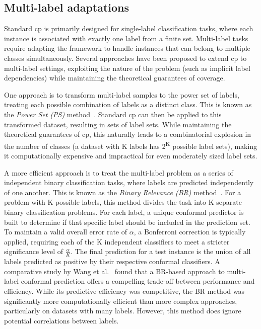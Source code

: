 \subsection{Multi-label adaptations}

Standard \gls{cp} is primarily designed for single-label classification tasks,
where each instance is associated with exactly one label from a finite set.
Multi-label tasks require adapting the framework to handle instances
that can belong to multiple classes simultaneously.
Several approaches have been proposed to extend \gls{cp} to multi-label settings,
exploiting the nature of the problem (such as implicit label dependencies)
while maintaining the theoretical guarantees of coverage.

One approach is to transform multi-label samples to the power set of labels,
treating each possible combination of labels as a distinct class.
This is known as the \emph{Power Set (PS)} method~\cite{papadopoulos2014cross}.
Standard \gls{cp} can then be applied to this transformed dataset,
resulting in sets of label sets.
While maintaining the theoretical guarantees of \gls{cp},
this naturally leads to a combinatorial explosion in the number of classes
(a dataset with K labels has 2\textsuperscript{K} possible label sets),
making it computationally expensive and impractical
for even moderately sized label sets.

A more efficient approach is to treat the multi-label problem as
a series of independent binary classification tasks,
where labels are predicted independently of one another.
This is known as the \emph{Binary Relevance (BR)} method~\cite{wang2015comparison}.
For a problem with K possible labels, this method divides the task
into K separate binary classification problems.
For each label, a unique conformal predictor is built
to determine if that specific label should be included in the prediction set.
To maintain a valid overall error rate of \(\alpha\),
a Bonferroni correction is typically applied,
requiring each of the K independent classifiers to meet
a stricter significance level of \(\frac{\alpha}{K}\).
The final prediction for a test instance is the union of all labels
predicted as positive by their respective conformal classifiers.
A comparative study by Wang et al.~\cite{wang2015comparison}
found that a BR-based approach
to multi-label conformal prediction offers a compelling trade-off
between performance and efficiency.
While its predictive efficiency was competitive,
the BR method was significantly more computationally efficient than more complex approaches,
particularly on datasets with many labels.
However, this method does ignore potential correlations between labels.

